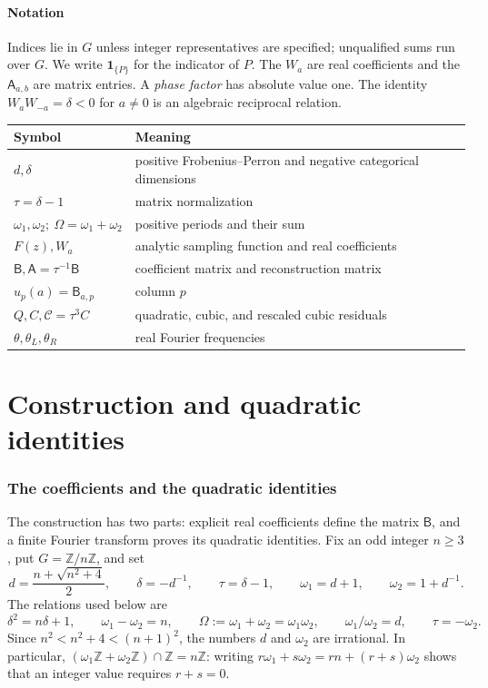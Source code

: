 \documentclass[11pt]{article}
\numberwithin{equation}{section}
\theoremstyle{definition}
\theoremstyle{remark}
\newcommand{\Z}{\mathbb Z}
\newcommand{\ind}[1]{\mathbf1_{\{#1\}}}
\begin{document}
\subsection*{Notation}
Indices lie in $G$ unless integer representatives are specified;
unqualified sums run over $G$. We write $\ind{P}$ for the indicator
of $P$. The $W_a$ are real coefficients and the $\mathsf A_{a,b}$
are matrix entries. A \emph{phase factor} has absolute value one.
The identity $W_aW_{-a}=\delta<0$ for $a\ne0$ is an algebraic
reciprocal relation.
\begin{center}
\small
\begin{tabular}{ll}
\toprule
Symbol & Meaning \\
\midrule
$d,\delta$ & positive Frobenius--Perron and negative categorical dimensions \\
$\tau=\delta-1$ & matrix normalization \\
$\omega_1,\omega_2;\ \Omega=\omega_1+\omega_2$ & positive periods and their sum \\
$F(z),W_a$ & analytic sampling function and real coefficients \\
$\mathsf B,\mathsf A=\tau^{-1}\mathsf B$ & coefficient matrix and reconstruction matrix \\
$u_p(a)=\mathsf B_{a,p}$ & column $p$ \\
$Q,C,\mathcal C=\tau^3 C$ & quadratic, cubic, and rescaled cubic residuals \\
$\theta,\theta_L,\theta_R$ & real Fourier frequencies \\
\bottomrule
\end{tabular}
\end{center}
\clearpage

\part{Construction and quadratic identities}
\label{part:quadratics}
\section{The coefficients and the quadratic identities}

The construction has two parts: explicit real coefficients define the
matrix $\mathsf B$, and a finite Fourier transform proves its quadratic
identities.
Fix an odd integer $n\geq3$, put $G=\Z/n\Z$, and set
\[
 d=\frac{n+\sqrt{n^2+4}}2,\qquad \delta=-d^{-1},\qquad
 \tau=\delta-1,\qquad
 \omega_1=d+1,\qquad \omega_2=1+d^{-1}.
\]
The relations used below are
\[
 \delta^2=n\delta+1,\qquad \omega_1-\omega_2=n,\qquad
 \Omega:=\omega_1+\omega_2=\omega_1\omega_2,\qquad
 \omega_1/\omega_2=d,\qquad \tau=-\omega_2.
\]
Since $n^2<n^2+4<(n+1)^2$, the numbers $d$ and $\omega_2$ are
irrational. In particular,
$(\omega_1\Z+\omega_2\Z)\cap\Z=n\Z$: writing
$r\omega_1+s\omega_2=rn+(r+s)\omega_2$ shows that an integer value
requires $r+s=0$.
\end{document}

